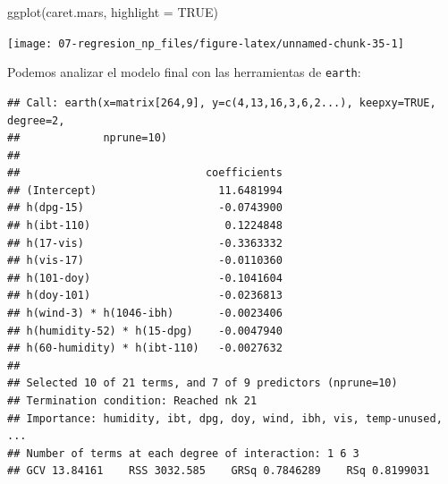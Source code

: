 \documentclass[
  spanish,
]{book}
\newenvironment{Shaded}{\begin{snugshade}}{\end{snugshade}}
\newcommand{\AttributeTok}[1]{\textcolor[rgb]{0.77,0.63,0.00}{#1}}
\newcommand{\CommentTok}[1]{\textcolor[rgb]{0.56,0.35,0.01}{\textit{#1}}}
\newcommand{\ConstantTok}[1]{\textcolor[rgb]{0.00,0.00,0.00}{#1}}
\newcommand{\DecValTok}[1]{\textcolor[rgb]{0.00,0.00,0.81}{#1}}
\newcommand{\FunctionTok}[1]{\textcolor[rgb]{0.00,0.00,0.00}{#1}}
\newcommand{\NormalTok}[1]{#1}
\newcommand{\SpecialCharTok}[1]{\textcolor[rgb]{0.00,0.00,0.00}{#1}}
\newcommand{\StringTok}[1]{\textcolor[rgb]{0.31,0.60,0.02}{#1}}
\theoremstyle{break}
\theoremstyle{definition}
\theoremstyle{definition}
\theoremstyle{definition}
\theoremstyle{definition}
\theoremstyle{remark}
\begin{document}
\begin{Shaded}
\begin{Highlighting}[]
\FunctionTok{ggplot}\NormalTok{(caret.mars, }\AttributeTok{highlight =} \ConstantTok{TRUE}\NormalTok{)}
\end{Highlighting}
\end{Shaded}

\begin{center}\texttt{[image: 07-regresion\_np\_files/figure-latex/unnamed-chunk-35-1]} \end{center}

Podemos analizar el modelo final con las herramientas de \texttt{earth}:

\begin{Shaded}
\end{Shaded}

\begin{verbatim}
## Call: earth(x=matrix[264,9], y=c(4,13,16,3,6,2...), keepxy=TRUE, degree=2,
##             nprune=10)
## 
##                             coefficients
## (Intercept)                   11.6481994
## h(dpg-15)                     -0.0743900
## h(ibt-110)                     0.1224848
## h(17-vis)                     -0.3363332
## h(vis-17)                     -0.0110360
## h(101-doy)                    -0.1041604
## h(doy-101)                    -0.0236813
## h(wind-3) * h(1046-ibh)       -0.0023406
## h(humidity-52) * h(15-dpg)    -0.0047940
## h(60-humidity) * h(ibt-110)   -0.0027632
## 
## Selected 10 of 21 terms, and 7 of 9 predictors (nprune=10)
## Termination condition: Reached nk 21
## Importance: humidity, ibt, dpg, doy, wind, ibh, vis, temp-unused, ...
## Number of terms at each degree of interaction: 1 6 3
## GCV 13.84161    RSS 3032.585    GRSq 0.7846289    RSq 0.8199031
\end{verbatim}

\begin{Shaded}
\end{Shaded}
\end{document}
